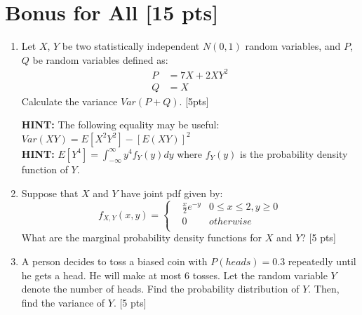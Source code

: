 \documentclass{article}
\begin{document}
\section{Bonus for All [15 pts]}
\begin{enumerate}[label=(\alph*)]
    \item Let $X$, $Y$ be two statistically independent $N(0, 1)$ random variables, and $P$, $Q$ be random variables defined as: 
    \begin{align*}
        P &= 7X + 2XY^2 \\
        Q &= X
    \end{align*}
    Calculate the variance $Var(P + Q)$. [5pts]
    
    \textbf{HINT:} The following equality may be useful: $Var(XY) = E[X^2Y^2] - [E(XY)]^2$ \\
    \textbf{HINT:} $E[Y^4] = \int_{-\infty}^{\infty}y^4 f_Y(y)dy$ where $f_Y(y)$ is the probability density function of $Y$.
    
    \item Suppose that $X$ and $Y$ have joint pdf given by:
    $$f_{X,Y}(x,y)=\left\{
    \begin{aligned}
        &\frac{x}{2}e^{-y} & 0 \leq x \leq 2, y \geq 0 \\
        &0 & otherwise\\
    \end{aligned}\right.$$
    What are the marginal probability density functions for $X$ and  $Y$? [5 pts]

    \item A person decides to toss a biased coin with $P(heads)=0.3$ repeatedly until he gets a head. He will make at most 6 tosses. Let the random variable $Y$ denote the number of heads. Find the probability distribution of $Y$. Then, find the variance of $Y$. [5 pts]    
\end{enumerate}
\end{document}
